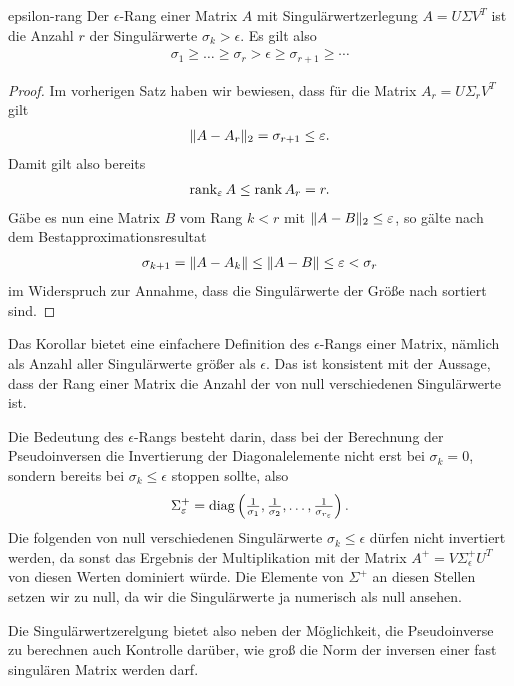 \begin{Korollar}{epsilon-rang}
  Der $\epsilon$-Rang einer Matrix $A$ mit Singulärwertzerlegung
  $A=U\Sigma V^T$ ist die Anzahl $r$ der Singulärwerte $\sigma_k>\epsilon$. Es gilt also
  \begin{gather}
    \sigma_1 \ge \dots \ge \sigma_{r}
    > \epsilon \ge \sigma_{r+1} \ge \cdots
  \end{gather}
\end{Korollar}

\begin{proof}
  Im vorherigen Satz haben wir bewiesen, dass für die Matrix $A_{r} = U\Sigma_r V^T$ gilt
  \begin{gather}
    \lVert A-A_r\rVert_2 = \sigma_{r+1} \le \varepsilon.
  \end{gather}
  Damit gilt also bereits
  \begin{gather}
    \operatorname{rank}_\varepsilon A \le \operatorname{rank} A_r = r.
  \end{gather}
  Gäbe es nun eine Matrix $B$ vom Rang $k<r$ mit
  $\lVert A-B\rVert_2 \le \varepsilon$, so gälte nach dem
  Bestapproximationsresultat
  \begin{gather}
    \sigma_{k+1} = \lVert A-A_k\rVert \le \lVert A-B\rVert \le \varepsilon < \sigma_r
  \end{gather}
  im Widerspruch zur Annahme, dass die Singulärwerte der Größe nach
  sortiert sind.
\end{proof}

\begin{remark}
  Das Korollar bietet eine einfachere Definition des $\epsilon$-Rangs
  einer Matrix, nämlich als Anzahl aller Singulärwerte größer als
  $\epsilon$. Das ist konsistent mit der Aussage, dass der Rang einer
  Matrix die Anzahl der von null verschiedenen Singulärwerte ist.
\end{remark}

\begin{remark}
  Die Bedeutung des $\epsilon$-Rangs besteht darin, dass bei der
  Berechnung der Pseudoinversen die Invertierung der Diagonalelemente
  nicht erst bei $\sigma_k=0$, sondern bereits bei
  $\sigma_k\le \epsilon$ stoppen sollte, also
  \begin{gather}
    \Sigma^+_\varepsilon = \operatorname{diag}\left(\tfrac1{\sigma_1},\tfrac1{\sigma_2},\dots,\tfrac1{\sigma_{r_\varepsilon}}\right).
  \end{gather}
  Die folgenden von null verschiedenen Singulärwerte
  $\sigma_k\le \epsilon$ dürfen nicht invertiert werden, da sonst das
  Ergebnis der Multiplikation mit der Matrix
  $A^+ = V\Sigma^+_\epsilon U^T$ von diesen Werten dominiert
  würde. Die Elemente von $\Sigma^+$ an diesen Stellen setzen wir zu
  null, da wir die Singulärwerte ja numerisch als null ansehen.

  Die Singulärwertzerelgung bietet also neben der Möglichkeit, die
  Pseudoinverse zu berechnen auch Kontrolle darüber, wie groß die Norm
  der inversen einer fast singulären Matrix werden darf.
\end{remark}

